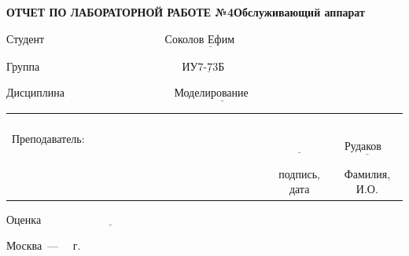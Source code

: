 \begin{titlepage}
	
	\begin{center}
		\noindent\begin{minipage}{1.2\textwidth}\centering
			\textbf{ОТЧЕТ ПО ЛАБОРАТОРНОЙ РАБОТЕ №4}\newline\textbf{Обслуживающий аппарат}\newline\newline
		\end{minipage}
	\end{center}

	\noindent Студент $\underline{\text{~~~~~~~~~~~~~~~~~~~~~~~~~~~~~~~~Соколов Ефим~~~~~~~~~~~~~~~~~~~~~~~~~~~~~~~~~~~~~~}}$
	
	\noindent Группа $\underline{\text{~~~~~~~~~~~~~~~~~~~~~~~~~~~~~~~~~~~~~~ИУ7-73Б~~~~~~~~~~~~~~~~~~~~~~~~~~~~~~~~~~~~~~~~~}}$
	
	\noindent Дисциплина $\underline{\text{~~~~~~~~~~~~~~~~~~~~~~~~~~~~~Моделирование~~~~~~~~~~~~~~~~~~~~~~~~~~~~~~~~~~~}}$\newline
	
	
	\noindent\begin{tabular}{lcc}
		&&\\
		&&\\
		&&\\
		&&\\
		Преподаватель: ~~~~~~~~~~~~~~~~~~~~~~~~~~~~~~~~~~~~~~~& $\underline{\text{~~~~~~~~~~~~}}$ & $\underline{\text{~~Рудаков И.В.~~}}$ \\
		& \footnotesize подпись, дата & \footnotesize Фамилия, И.О. \\
	\end{tabular}
	\newline\newline\newline
	\noindent Оценка $\underline{\text{~~~~~~~~~~~~~~~~~~~~~~~~~~~~~~~~~~~~}}$
	
	
	\begin{center}
		\vfill
		Москва~---~\the\year
		~г.
	\end{center}
 \restoregeometry
\end{titlepage}
